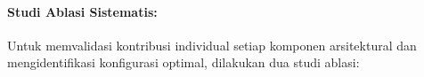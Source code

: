 \documentclass[12pt,a4paper]{article}
\begin{document}
% 

\paragraph{Studi Ablasi Sistematis:}
Untuk memvalidasi kontribusi individual setiap komponen arsitektural dan mengidentifikasi konfigurasi optimal, dilakukan dua studi ablasi:
\end{document}
